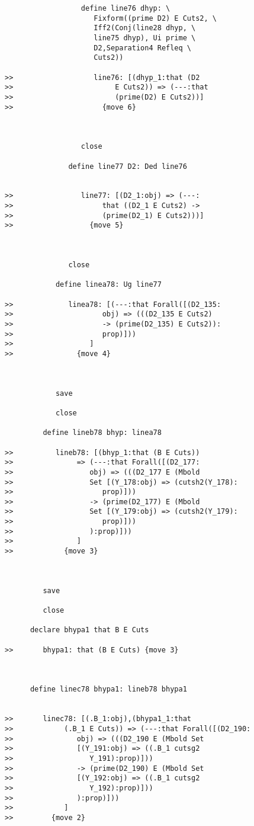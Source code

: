 \documentclass[12pt]{article}
\begin{document}
\begin{verbatim}
                  define line76 dhyp: \
                     Fixform((prime D2) E Cuts2, \
                     Iff2(Conj(line28 dhyp, \
                     line75 dhyp), Ui prime \
                     D2,Separation4 Refleq \
                     Cuts2))

>>                   line76: [(dhyp_1:that (D2
>>                        E Cuts2)) => (---:that
>>                        (prime(D2) E Cuts2))]
>>                     {move 6}



                  close

               define line77 D2: Ded line76


>>                line77: [(D2_1:obj) => (---:
>>                     that ((D2_1 E Cuts2) ->
>>                     (prime(D2_1) E Cuts2)))]
>>                  {move 5}



               close

            define linea78: Ug line77

>>             linea78: [(---:that Forall([(D2_135:
>>                     obj) => (((D2_135 E Cuts2)
>>                     -> (prime(D2_135) E Cuts2)):
>>                     prop)]))
>>                  ]
>>               {move 4}



            save

            close

         define lineb78 bhyp: linea78

>>          lineb78: [(bhyp_1:that (B E Cuts))
>>               => (---:that Forall([(D2_177:
>>                  obj) => (((D2_177 E (Mbold
>>                  Set [(Y_178:obj) => (cutsh2(Y_178):
>>                     prop)]))
>>                  -> (prime(D2_177) E (Mbold
>>                  Set [(Y_179:obj) => (cutsh2(Y_179):
>>                     prop)]))
>>                  ):prop)]))
>>               ]
>>            {move 3}



         save

         close

      declare bhypa1 that B E Cuts

>>       bhypa1: that (B E Cuts) {move 3}



      define linec78 bhypa1: lineb78 bhypa1


>>       linec78: [(.B_1:obj),(bhypa1_1:that
>>            (.B_1 E Cuts)) => (---:that Forall([(D2_190:
>>               obj) => (((D2_190 E (Mbold Set
>>               [(Y_191:obj) => ((.B_1 cutsg2
>>                  Y_191):prop)]))
>>               -> (prime(D2_190) E (Mbold Set
>>               [(Y_192:obj) => ((.B_1 cutsg2
>>                  Y_192):prop)]))
>>               ):prop)]))
>>            ]
>>         {move 2}




\end{verbatim}
\end{document}
